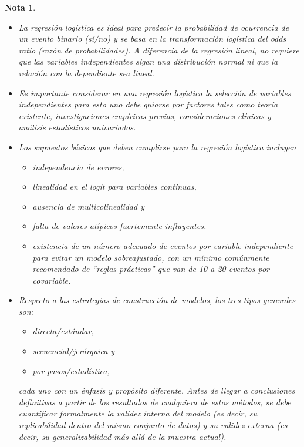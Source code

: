 \documentclass[12pt]{article}
\newtheorem{Note}{Nota}%
\begin{document}
\begin{Note}
\begin{itemize}
\item[$\diamond$] La regresi\'on log\'istica es ideal para predecir la probabilidad de ocurrencia de un evento binario (s\'i/no) y se basa en la transformaci\'on log\'istica del \textit{odds ratio} (raz\'on de probabilidades). A diferencia de la regresi\'on lineal, no requiere que las variables independientes sigan una distribuci\'on normal ni que la relaci\'on con la dependiente sea lineal.

\item[$\diamond$] Es importante considerar en una regresi\'on log\'istica la \textit{selecci\'on de variables independientes} para esto uno debe guiarse por factores tales como teor\'ia existente, investigaciones emp\'iricas previas, consideraciones cl\'inicas y an\'alisis estad\'isticos univariados. 

\item[$\diamond$] Los supuestos b\'asicos que deben cumplirse para la regresi\'on log\'istica incluyen
\begin{itemize}
\item[$\diamondsuit$] independencia de errores, 
\item[$\diamondsuit$] linealidad en el \textit{logit} para variables continuas, 
\item[$\diamondsuit$] ausencia de multicolinealidad y 
\item[$\diamondsuit$] falta de valores at\'ipicos fuertemente influyentes.
\item[$\diamondsuit$] existencia de un n\'umero adecuado de eventos por variable independiente para evitar un modelo sobreajustado, con un m\'inimo com\'unmente recomendado de “reglas pr\'acticas” que van de 10 a 20 eventos por covariable.
\end{itemize}

\item[$\diamond$] Respecto a las estrategias de construcci\'on de modelos, los tres tipos generales son: 
\begin{itemize}
\item[$\diamondsuit$] directa/est\'andar, 
\item[$\diamondsuit$] secuencial/jer\'arquica y 
\item[$\diamondsuit$] por pasos/estad\'istica,
\end{itemize}
cada uno con un \'enfasis y prop\'osito diferente. Antes de llegar a conclusiones definitivas a partir de los resultados de cualquiera de estos m\'etodos, se debe cuantificar formalmente la validez interna del modelo (es decir, su replicabilidad dentro del mismo conjunto de datos) y su validez externa (es decir, su generalizabilidad m\'as all\'a de la muestra actual).
\end{itemize}
\end{Note}
\end{document}
